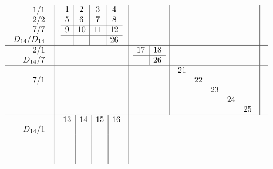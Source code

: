 \documentclass[12pt,a4paper]{amsart}
\begin{document}
\scriptsize {}
\begin{align*}
  \begin{array}{r||c|c|c|c}
    \begin{array}{r}
      1/1 \\ 2/2 \\ 7/7 \\ D_{14}/D_{14}
    \end{array}
    &
    \begin{array}{c|c|c|c}
1&2&3&4\\\hline
5&6&7&8\\\hline
9&10&11&12\\\hline
&&&26\\
    \end{array}
&&&\\\hline
    \begin{array}{r}
      2/1 \\ D_{14}/7
    \end{array}
&&
    \begin{array}{c|c}
      17&18\\\hline
      &26\\
    \end{array}
&&\\\hline
    \begin{array}{r}
      7/1 \\ \\ \\
    \end{array}
&
&
&
  \begin{array}{ccccc}
21&&&&\\
&22&&&\\
&&23&&\\
&&&24&\\
&&&&25\\
  \end{array}
&\\\hline
    \begin{array}{r}
      D_{14}/1 \\  \\ \\
    \end{array}
&
    \begin{array}{c|c|c|c}
13&14&15&16\\
&&&\\
&&&\\
&&&\\
&&&\\
    \end{array}

\end{array}
\end{align*}
\end{document}
